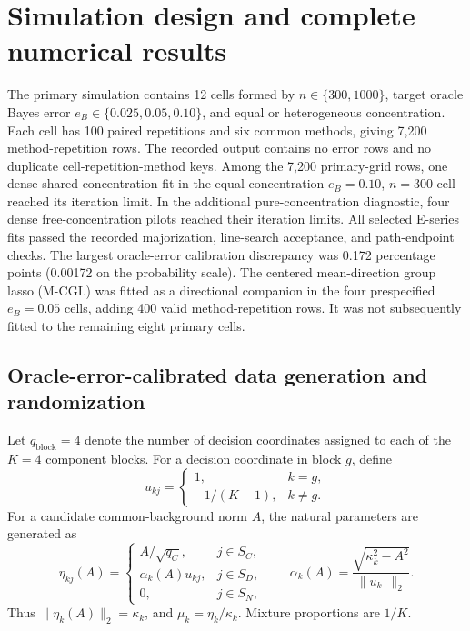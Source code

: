 \documentclass[preprint,12pt,authoryear]{elsarticle}
\begin{document}
\section{Simulation design and complete numerical results}
\label{sec:s-simulation-results}

The primary simulation contains 12 cells formed by
$n\in\{300,1000\}$, target oracle Bayes error
$e_B\in\{0.025,0.05,0.10\}$, and equal or heterogeneous concentration.
Each cell has 100 paired repetitions and six common methods, giving 7,200
method-repetition rows. The recorded output contains no error rows and no
duplicate cell-repetition-method keys. Among the 7,200 primary-grid rows, one
dense shared-concentration fit in the equal-concentration $e_B=0.10$, $n=300$
cell reached its iteration limit. In the additional pure-concentration
diagnostic, four dense free-concentration pilots reached their iteration
limits. All selected E-series fits
passed the recorded majorization,
line-search acceptance, and path-endpoint checks. The largest oracle-error
calibration discrepancy was 0.172 percentage points (0.00172 on the probability
scale). The centered mean-direction group lasso (M-CGL) was fitted as a
directional companion in the four prespecified
$e_B=0.05$ cells, adding 400 valid method-repetition rows. It was not
subsequently fitted to the remaining eight primary cells.

\subsection{Oracle-error-calibrated data generation and randomization}

Let $q_{\mathrm{block}}=4$ denote the number of decision coordinates assigned to each of the
$K=4$ component blocks. For a decision coordinate in block $g$, define
\[
u_{kj}=\begin{cases}
1, & k=g,\\
-1/(K-1), & k\ne g.
\end{cases}
\]
For a candidate common-background norm $A$, the natural parameters are
generated as
\[
\eta_{kj}(A)=
\begin{cases}
A/\sqrt{q_C}, & j\in S_C,\\
\alpha_k(A)u_{kj}, & j\in S_D,\\
0, & j\in S_N,
\end{cases}
\qquad
\alpha_k(A)=\frac{\sqrt{\kappa_k^2-A^2}}{\lVert u_{k\cdot}\rVert_2}.
\]
Thus $\lVert\eta_k(A)\rVert_2=\kappa_k$, and
$\mu_k=\eta_k/\kappa_k$. Mixture proportions are $1/K$.
\end{document}
